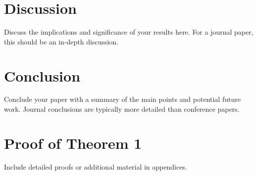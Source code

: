\documentclass[journal,twoside]{IEEEtran}
\begin{document}
\section{Discussion}
Discuss the implications and significance of your results here. For a journal paper, this should be an in-depth discussion.

\section{Conclusion}
Conclude your paper with a summary of the main points and potential future work. Journal conclusions are typically more detailed than conference papers.

\appendix
\section{Proof of Theorem 1}
Include detailed proofs or additional material in appendices.



\end{document}
